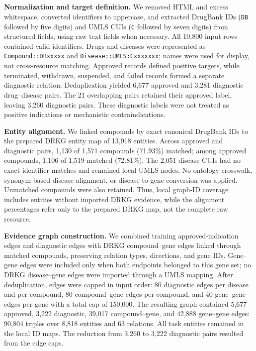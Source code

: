 
\subsection{}
\label{sec:repodb_alignment}
\begin{revisionblock}
\textbf{Normalization and target definition.}
We removed HTML and excess whitespace, converted identifiers to uppercase, and extracted DrugBank IDs (\texttt{DB} followed by five digits) and UMLS CUIs (\texttt{C} followed by seven digits) from structured fields, using raw text fields when necessary. All 10,800 input rows contained valid identifiers. Drugs and diseases were represented as \texttt{Compound::DBxxxxx} and \texttt{Disease::UMLS:Cxxxxxxx}; names were used for display, not cross-resource matching. Approved records defined positive targets, while terminated, withdrawn, suspended, and failed records formed a separate diagnostic relation. Deduplication yielded 6,677 approved and 3,281 diagnostic drug--disease pairs. The 21 overlapping pairs retained their approved label, leaving 3,260 diagnostic pairs. These diagnostic labels were not treated as positive indications or mechanistic contraindications.

\textbf{Entity alignment.}
We linked compounds by exact canonical DrugBank IDs to the prepared DRKG entity map of 13,918 entities. Across approved and diagnostic pairs, 1,130 of 1,571 compounds (71.93\%) matched; among approved compounds, 1,106 of 1,519 matched (72.81\%). The 2,051 disease CUIs had no exact identifier matches and remained local UMLS nodes. No ontology crosswalk, synonym-based disease alignment, or disease-to-gene conversion was applied. Unmatched compounds were also retained. Thus, local graph-ID coverage includes entities without imported DRKG evidence, while the alignment percentages refer only to the prepared DRKG map, not the complete raw resource.

\textbf{Evidence graph construction.}
We combined training approved-indication edges and diagnostic edges with DRKG compound--gene edges linked through matched compounds, preserving relation types, directions, and gene IDs. Gene--gene edges were included only when both endpoints belonged to this gene set; no DRKG disease--gene edges were imported through a UMLS mapping. After deduplication, edges were capped in input order: 80 diagnostic edges per disease and per compound, 80 compound--gene edges per compound, and 40 gene--gene edges per gene with a total cap of 150,000. The resulting graph contained 5,677 approved, 3,222 diagnostic, 39,017 compound--gene, and 42,888 gene--gene edges: 90,804 triples over 8,818 entities and 63 relations. All task entities remained in the local ID maps. The reduction from 3,260 to 3,222 diagnostic pairs resulted from the edge caps.


\end{revisionblock}

